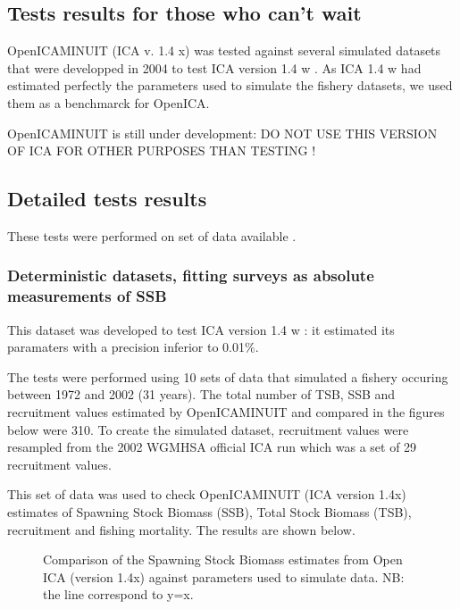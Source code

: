 \subsection{Tests results for those who can't wait}

OpenICAMINUIT (ICA v. 1.4 x) was tested against several simulated datasets that were developped in 2004 to test ICA version 1.4 w \citep{kieTR05}. As ICA 1.4 w had estimated perfectly the parameters used to simulate the fishery datasets, we used them as a benchmarck for OpenICA.

OpenICAMINUIT is still under development: DO NOT USE THIS VERSION OF ICA FOR OTHER PURPOSES THAN TESTING !

\subsection{Detailed tests results}

These tests were performed on set of data available .

\subsubsection{Deterministic datasets, fitting surveys as absolute measurements of SSB}

This dataset was developed to test ICA version 1.4 w \citep{kieTR05}: it estimated its paramaters with a precision inferior to 0.01\%. 

The tests were performed using 10 sets of data that simulated a fishery occuring between 1972 and 2002 (31 years). The total number of TSB, SSB and recruitment values estimated by OpenICAMINUIT and compared in the figures below were 310. To create the simulated dataset, recruitment values were resampled from the 2002 WGMHSA official ICA run which was a set of 29 recruitment values.

This set of data was used to check OpenICAMINUIT (ICA version 1.4x) estimates of Spawning Stock Biomass (SSB), Total Stock Biomass (TSB), recruitment and fishing mortality. The results are shown below.

\begin{figure}
	\begin{center}
	\end{center}
	\caption{Comparison of the Spawning Stock Biomass estimates from Open ICA (version 1.4x) against parameters used to simulate data. NB: the line correspond to y=x.}
\end{figure}

